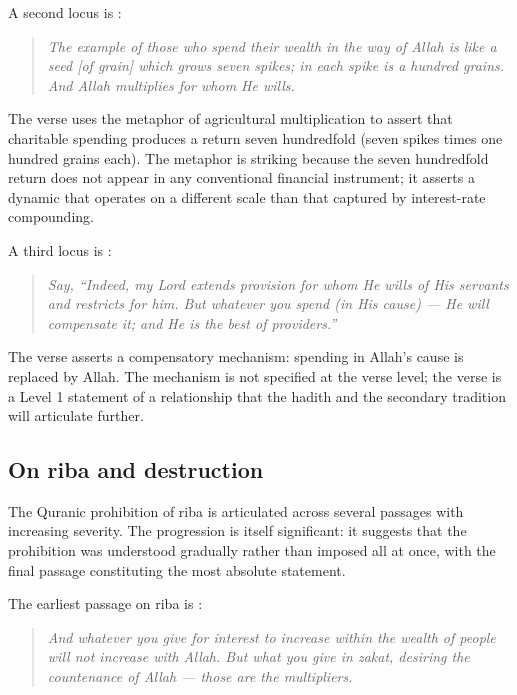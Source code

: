 A second locus is :

\begin{quote}
\textit{The example of those who spend their wealth in the way of
Allah is like a seed [of grain] which grows seven spikes; in each
spike is a hundred grains. And Allah multiplies for whom He wills.}
\end{quote}

The verse uses the metaphor of agricultural multiplication to assert
that charitable spending produces a return seven hundredfold (seven
spikes times one hundred grains each). The metaphor is striking
because the seven hundredfold return does not appear in any
conventional financial instrument; it asserts a dynamic that operates
on a different scale than that captured by interest-rate compounding.

A third locus is :

\begin{quote}
\textit{Say, ``Indeed, my Lord extends provision for whom He wills of
His servants and restricts for him. But whatever you spend (in His
cause) — He will compensate it; and He is the best of providers.''}
\end{quote}

The verse asserts a compensatory mechanism: spending in Allah's cause
is replaced by Allah. The mechanism is not specified at the verse
level; the verse is a Level 1 statement of a relationship that the
hadith and the secondary tradition will articulate further.

\subsection{On riba and destruction}

The Quranic prohibition of riba is articulated across several
passages with increasing severity. The progression is itself
significant: it suggests that the prohibition was understood
gradually rather than imposed all at once, with the final passage
constituting the most absolute statement.

The earliest passage on riba is :

\begin{quote}
\textit{And whatever you give for interest to increase within the
wealth of people will not increase with Allah. But what you give in
zakat, desiring the countenance of Allah --- those are the
multipliers.}
\end{quote}

